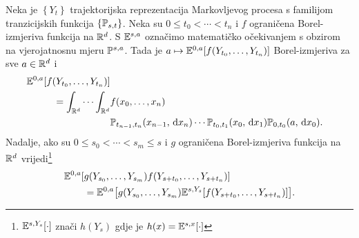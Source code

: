 \documentclass[main.tex]{subfiles}
\begin{document}
\begin{propozicija}
	Neka je \( \left\{ Y_t \right\} \) trajektorijska reprezentacija Markovljevog procesa s
	familijom tranzicijskih funkcija \( \left\{ \Ptrans_{s, t}  \right\} \). Neka su
	\( 0 \le t_0 < \cdots < t_n \) i \( f \) ograničena Borel-izmjeriva funkcija na \( \R^d \).
	S \( \E^{s,a} \) označimo matematičko očekivanjem s obzirom na vjerojatnosnu mjeru
	\( \P^{s,a} \). Tada je \( a \mapsto \E^{0,a}[f(Y_{t_0},\ldots,Y_{t_n})] \) Borel-izmjeriva za sve \( a \in \R^d \) i
	\begin{equation} \label{markov-prop1}
		\begin{aligned}
			\E^{0,a}[f(Y_{t_0},\ldots,Y_{t_n})]                                               \\
			= \int_{\R^d} \cdots \int_{\R^d} & f(x_0,\ldots,x_n)                              \\
			                                 & \Ptrans_{t_{n-1}, t_n}(x_{n-1}, \D x_n) \cdots
			\Ptrans_{t_0, t_1}(x_0, \D x_1) \Ptrans_{0, t_0}(a, \D x_0).
		\end{aligned}
	\end{equation}
	Nadalje, ako su \( 0 \le s_0 < \cdots < s_m \le s \) i \( g \) ograničena Borel-izmjeriva
	funkcija na \( \R^d \) vrijedi\footnote{\( \E^{s,Y_s}[\cdot] \) znači \( h(Y_s) \) gdje
		je \( h(x) = \E^{s,x}[\cdot] \)}
	\begin{equation} \label{markov-svojstvo}
		\begin{aligned}
			\E^{0,a}[ & g(Y_{s_0},\ldots,Y_{s_m}) f(Y_{s+t_0},\ldots,Y_{s+t_n})]                                   \\
			          & =\E^{0,a}\bigl[g(Y_{s_0},\ldots,Y_{s_m}) \E^{s, Y_s}[f(Y_{s+t_0},\ldots,Y_{s+t_n})]\bigr].
		\end{aligned}
	\end{equation}
\end{propozicija}
\end{document}

